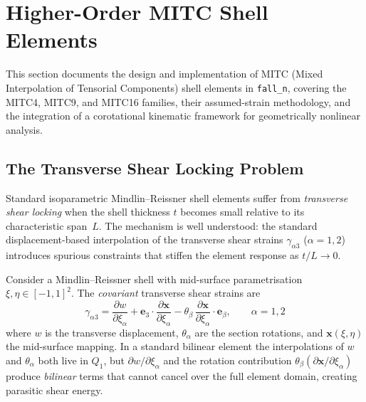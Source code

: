 
\section{Higher-Order MITC Shell Elements}
\label{sec:mitc-shells}

This section documents the design and implementation of MITC (Mixed
Interpolation of Tensorial Components) shell elements in
\texttt{fall\_n}, covering the MITC4, MITC9, and MITC16 families, their
assumed-strain methodology, and the integration of a corotational
kinematic framework for geometrically nonlinear analysis.

\subsection{The Transverse Shear Locking Problem}
\label{sec:shear-locking}

Standard isoparametric Mindlin--Reissner shell elements suffer from
\emph{transverse shear locking} when the shell thickness $t$ becomes
small relative to its characteristic span~$L$.  The mechanism is
well understood: the standard displacement-based interpolation of the
transverse shear strains $\gamma_{\alpha 3}$ ($\alpha=1,2$) introduces
spurious constraints that stiffen the element response as
$t/L \to 0$.

Consider a Mindlin--Reissner shell with mid-surface parametrisation
$\xi, \eta \in [-1,1]^2$.  The \emph{covariant} transverse shear
strains are
\begin{equation}
  \label{eq:cov-shear}
  \gamma_{\alpha 3}
  = \frac{\partial w}{\partial \xi_\alpha}
    + \mathbf{e}_3 \cdot
      \frac{\partial \mathbf{x}}{\partial \xi_\alpha}
    - \theta_\beta \,
      \frac{\partial \mathbf{x}}{\partial \xi_\alpha}
      \cdot \mathbf{e}_\beta
  ,
  \qquad \alpha = 1,2
\end{equation}
where $w$ is the transverse displacement, $\theta_\alpha$ are the
section rotations, and $\mathbf{x}(\xi,\eta)$ the mid-surface
mapping.  In a standard bilinear element the interpolations of $w$
and $\theta_\alpha$ both live in $Q_1$, but
$\partial w/\partial \xi_\alpha$ and the rotation contribution
$\theta_\beta (\partial \mathbf{x}/\partial \xi_\alpha)$ produce
\emph{bilinear} terms that cannot cancel over the full element
domain, creating parasitic shear energy.

